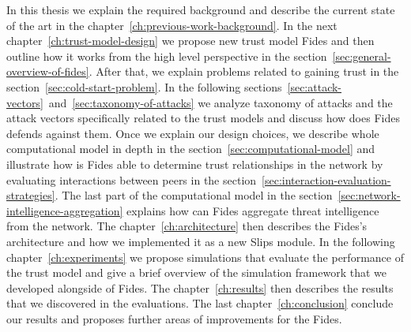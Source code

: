 In this thesis we explain the required background and describe the current state of the art in the chapter~\ref{ch:previous-work-background}.
In the next chapter~\ref{ch:trust-model-design} we propose new trust model Fides and then outline how it works from the high level perspective in the section~\ref{sec:general-overview-of-fides}.
After that, we explain problems related to gaining trust in the section~\ref{sec:cold-start-problem}.
In the following sections~\ref{sec:attack-vectors}~and~\ref{sec:taxonomy-of-attacks} we analyze taxonomy of attacks and the attack vectors specifically related to the trust models and discuss how does Fides defends against them.
Once we explain our design choices, we describe whole computational model in depth in the section~\ref{sec:computational-model} and illustrate how is Fides able to determine trust relationships in the network by evaluating interactions between peers in the section~\ref{sec:interaction-evaluation-strategies}.
The last part of the computational model in the section~\ref{sec:network-intelligence-aggregation} explains how can Fides aggregate threat intelligence from the network.
The chapter~\ref{ch:architecture} then describes the Fides's architecture and how we implemented it as a new Slips module.
In the following chapter~\ref{ch:experiments} we propose simulations that evaluate the performance of the trust model and give a brief overview of the simulation framework that we developed alongside of Fides.
The chapter~\ref{ch:results} then describes the results that we discovered in the evaluations. The last chapter~\ref{ch:conclusion} conclude our results and proposes further areas of improvements for the Fides.
